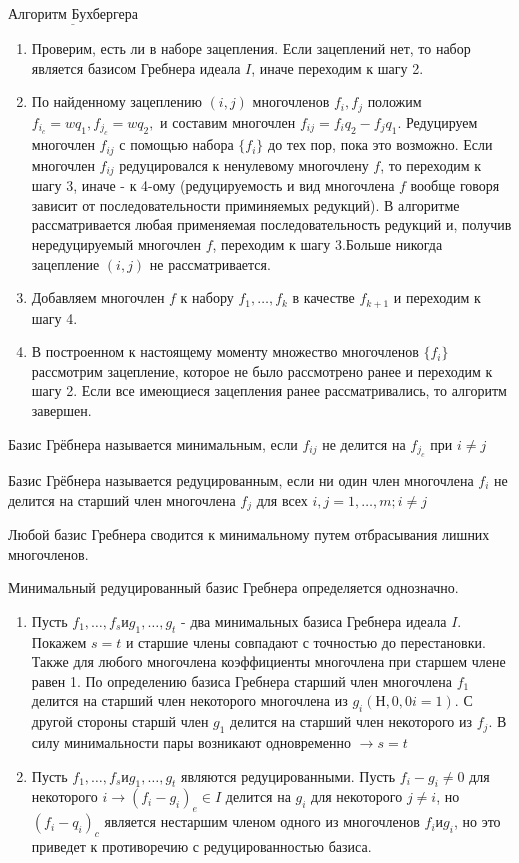 $\underline{\text{Алгоритм Бухбергера}}$
\begin{enumerate}
	\item Проверим, есть ли в наборе зацепления. Если зацеплений нет, то набор является базисом Гребнера идеала $I$, иначе переходим к шагу 2.
	\item По найденному зацеплению $(i,j)$ многочленов $f_i,f_j$ положим $f_{i_c} = wq_1, f_{j_c} = wq_2,$ и составим многочлен $f_{ij} = f_iq_2 - f_jq_1$. Редуцируем многочлен $f_{ij}$ с помощью набора $\{f_i\}$ до тех пор, пока это возможно. Если многочлен $f_{ij}$ редуцировался к ненулевому многочлену $f$, то переходим к шагу 3, иначе - к 4-ому (редуцируемость и вид многочлена $f$ вообще говоря зависит от последовательности приминяемых редукций). В алгоритме рассматривается любая применяемая последовательность редукций и, получив нередуцируемый многочлен $f$, переходим к шагу 3.Больше никогда зацепление $(i,j)$ не рассматривается. 
	\item Добавляем многочлен $f$ к набору $f_1,\ldots,f_k$ в качестве $f_{k+1}$ и переходим к шагу 4.
	\item В построенном к настоящему моменту множество многочленов $\{f_i\}$ рассмотрим зацепление, которое не было рассмотрено ранее и переходим к шагу 2. Если все имеющиеся зацепления ранее рассматривались, то алгоритм завершен.
\end{enumerate}

\opr Базис Грёбнера называется минимальным, если $f_{ij}$ не делится на $f_{j_c}$ при $i \neq j$

\opr Базис Грёбнера называется редуцированным, если ни один член многочлена $f_i$ не делится на старший член многочлена $f_j$ для всех $i,j = 1,\ldots,m; i \neq j$

\note Любой базис Гребнера сводится к минимальному путем отбрасывания лишних многочленов.

\thr Минимальный редуцированный базис Гребнера определяется однозначно.

\proof

\begin{enumerate}
	\item Пусть $f_1,\ldots,f_s и g_1,\ldots,g_t$ - два минимальных базиса Гребнера идеала $I$. Покажем $s = t$ и старшие члены совпадают с точностью до перестановки. Также для любого многочлена коэффициенты многочлена при старшем члене равен 1. По определению базиса Гребнера старший член многочлена $f_1$ делится на старший член некоторого многочлена из $g_i (Н,0,0 i = 1)$. С другой стороны старшй член $g_1$ делится на старший член некоторого из $f_j$. В силу минимальности пары возникают одновременно $\rightarrow s = t$
	\item Пусть $f_1,\ldots,f_s и g_1,\ldots,g_t$ являются редуцированными. Пусть $f_i - g_i \neq 0$ для некоторого $i \rightarrow (f_i - g_i)_e \in I$ делится на $g_i$ для некоторого $j \neq i$, но $(f_i - q_i)_c$ является нестаршим членом одного из многочленов $f_i и g_i$, но это приведет к противоречию с редуцированностью базиса. 
\end{enumerate}
